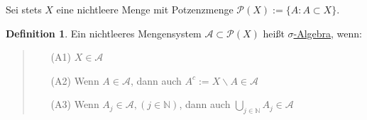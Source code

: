 \documentclass[a4paper]{scrreprt}
\newcommand{\PowerSet}{\mathcal{P}}
\newcommand{\N}{\mathbb{N}}
\newcommand{\jlabel}[1]{\label{j_#1}}
\theoremstyle{plain}
\theoremstyle{definition}
\newtheorem{defn}[thm]{Definition}
\begin{document}
Sei stets $X$ eine nichtleere Menge mit Potzenzmenge $\PowerSet(X) := \{A : A \subset X\}$.


\begin{defn}
\jlabel{Def 1.1}
    Ein nichtleeres Mengensystem $\mathcal{A} \subset \PowerSet(X)$ heißt \uline{$\sigma$-Algebra}, wenn:
    \begin{quote}
    \begin{itemize}
        \item[(A1)] $X \in \mathcal{A}$
        \item[(A2)] Wenn $A \in \mathcal{A}$, dann auch $A^c := X \backslash A \in \mathcal{A}$
        \item[(A3)] Wenn $A_j \in \mathcal{A}, (j \in \N)$, dann auch $\bigcup_{j \in \N} A_j \in \mathcal{A}$
    \end{itemize}
    \end{quote}
\end{defn}
\end{document}
